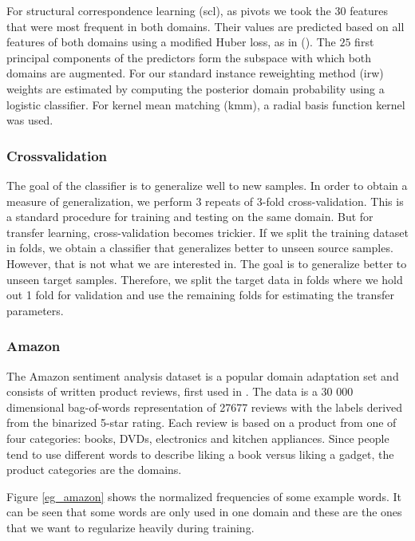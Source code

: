 \documentclass[twoside,11pt]{article}
\begin{document}
For structural correspondence learning ({\sc scl}), as pivots we took the 30 features that were most frequent in both domains. Their values are predicted based on all features of both domains using a modified Huber loss, as in (\citealp{ando2005framework}). The $25$ first principal components of the predictors form the subspace with which both domains are augmented. For our standard instance reweighting method ({\sc irw}) weights are estimated by computing the posterior domain probability using a logistic classifier. For kernel mean matching ({\sc kmm}), a radial basis function kernel was used. 

\subsubsection{Crossvalidation}
The goal of the classifier is to generalize well to new samples. In order to obtain a measure of generalization, we perform 3 repeats of 3-fold cross-validation. This is a standard procedure for training and testing on the same domain. But for transfer learning, cross-validation becomes trickier. If we split the training dataset in folds, we obtain a classifier that generalizes better to unseen source samples. However, that is not what we are interested in. The goal is to generalize better to unseen target samples. Therefore, we split the target data in folds where we hold out 1 fold for validation and use the remaining folds for estimating the transfer parameters. 

\subsubsection{Amazon}
The Amazon sentiment analysis dataset is a popular domain adaptation set and consists of written product reviews, first used in \cite{blitzer2007biographies}. The data is a 30 000 dimensional bag-of-words representation of 27677 reviews with the labels derived from the binarized 5-star rating. Each review is based on a product from one of four categories: books, DVDs, electronics and kitchen appliances. Since people tend to use different words to describe liking a book versus liking a gadget, the product categories are the domains. 

Figure \ref{eg_amazon} shows the normalized frequencies of some example words. It can be seen that some words are only used in one domain and these are the ones that we want to regularize heavily during training.
\end{document}
